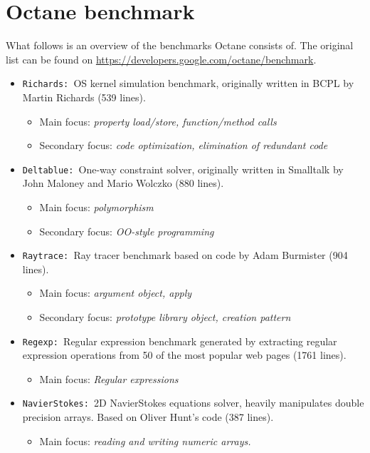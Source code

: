 \section{Octane benchmark}
\label{a:octane_benchmark}
What follows is an overview of the benchmarks Octane consists of.
The original list can be found on \url{https://developers.google.com/octane/benchmark}.
\begin{itemize}
\item \texttt{Richards: }OS kernel simulation benchmark, originally written in BCPL by Martin Richards (539 lines).
  \begin{itemize}
    \item Main focus: \textit{property load/store, function/method calls}
    \item Secondary focus: \textit{code optimization, elimination of redundant code}
  \end{itemize}
\item \texttt{Deltablue: }One-way constraint solver, originally written in Smalltalk by John Maloney and Mario Wolczko (880 lines).
  \begin{itemize}
    \item Main focus: \textit{polymorphism}
    \item Secondary focus: \textit{OO-style programming}
  \end{itemize}
\item \texttt{Raytrace: }Ray tracer benchmark based on code by Adam Burmister (904 lines).
  \begin{itemize}
    \item Main focus: \textit{argument object, apply}
    \item Secondary focus: \textit{prototype library object, creation pattern}
  \end{itemize}
\item \texttt{Regexp: }Regular expression benchmark generated by extracting regular expression operations from 50 of the most popular web pages (1761 lines).
  \begin{itemize}
    \item Main focus: \textit{Regular expressions}
  \end{itemize}
  \item \texttt{NavierStokes: }2D NavierStokes equations solver, heavily manipulates double precision arrays. Based on Oliver Hunt's code (387 lines).
  \begin{itemize}
    \item Main focus: \textit{reading and writing numeric arrays.}

\end{itemize}
\end{itemize}
